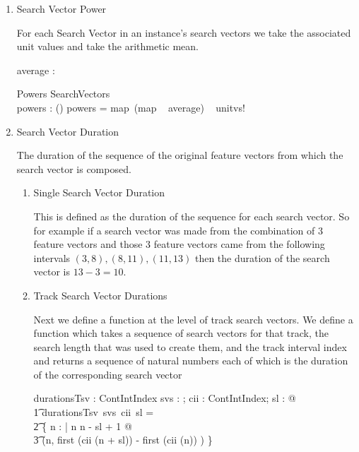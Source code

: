 \documentclass[11pt]{article}
\begin{document}
\begin{enumerate}
\item \textsf{Search Vector Power}

For each Search Vector in an instance's search vectors we take the associated unit values and take the arithmetic mean. 

\begin{axdef}
	average : \V \fun \R
\end{axdef}

\begin{schema}{Powers}
	SearchVectors \\
	powers : \seq (\seq \R) 
\where 
	powers = map~(map ~ average) ~  unitvs! \\
\end{schema}

\item \textsf{Search Vector Duration}

The duration of the sequence of the original feature vectors from which the search vector is composed. 

\begin{enumerate}

\item \textsf{Single Search Vector Duration}

This is defined as the duration of the sequence for each search vector. So for example if a search vector was made from the combination of 3 feature vectors and those 3 feature vectors came from the following intervals $ (3,8), (8,11), (11,13) $ then the duration of the search vector is $13-3=10$. 

\item \textsf{Track Search Vector Durations}

Next we define a function at the level of track search vectors. We define a function which takes a sequence of search vectors for that track, the search length that was used to create them, and the track interval index and returns a sequence of natural numbers each of which is the duration of the corresponding search vector

\begin{axdef}
	durationsTsv : \seq \Vdsl  \fun  ContIntIndex \fun \nat \fun  \seq \R
\where
	\forall svs : \seq \Vdsl;  cii :  ContIntIndex; sl : \nat @ \\
	\t1 durationsTsv~svs~cii~sl = \\
	\t2 \{ n : \nat | n  \upto n - sl + 1 @ \\
	\t3 (n,  first (cii (n + sl)) - first (cii (n)) ) \} 
\end{axdef}


\end{enumerate}
\end{enumerate}
\end{document}
